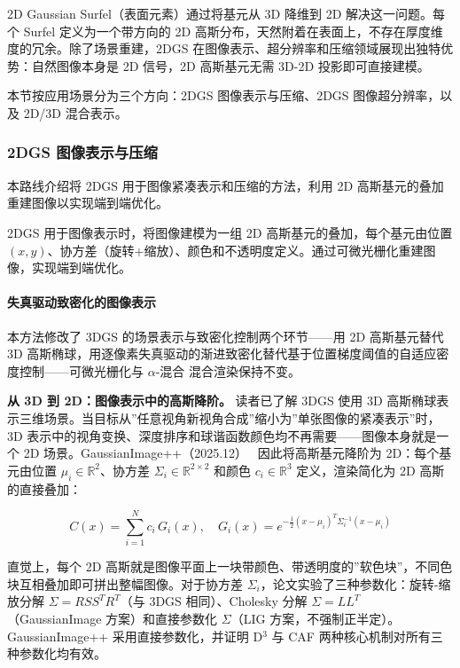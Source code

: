 2D Gaussian Surfel（表面元素）通过将基元从 3D 降维到 2D 解决这一问题。每个 Surfel 定义为一个带方向的 2D 高斯分布，天然附着在表面上，不存在厚度维度的冗余。除了场景重建，2DGS 在图像表示、超分辨率和压缩领域展现出独特优势：自然图像本身是 2D 信号，2D 高斯基元无需 3D-2D 投影即可直接建模。

本节按应用场景分为三个方向：2DGS 图像表示与压缩、2DGS 图像超分辨率，以及 2D/3D 混合表示。

\subsubsection{2DGS 图像表示与压缩}

本路线介绍将 2DGS 用于图像紧凑表示和压缩的方法，利用 2D 高斯基元的叠加重建图像以实现端到端优化。

2DGS 用于图像表示时，将图像建模为一组 2D 高斯基元的叠加，每个基元由位置 $(x, y)$、协方差（旋转+缩放）、颜色和不透明度定义。通过可微光栅化重建图像，实现端到端优化。

\paragraph{失真驱动致密化的图像表示}

本方法修改了 3DGS 的场景表示与致密化控制两个环节——用 2D 高斯基元替代 3D 高斯椭球，用逐像素失真驱动的渐进致密化替代基于位置梯度阈值的自适应密度控制——可微光栅化与 $\alpha$-混合 混合渲染保持不变。

\textbf{从 3D 到 2D：图像表示中的高斯降阶。} 读者已了解 3DGS 使用 3D 高斯椭球表示三维场景。当目标从”任意视角新视角合成”缩小为”单张图像的紧凑表示”时，3D 表示中的视角变换、深度排序和球谐函数颜色均不再需要——图像本身就是一个 2D 场景。GaussianImage++（2025.12）~\cite{2512_19108} 因此将高斯基元降阶为 2D：每个基元由位置 $\mu_i \in \mathbb{R}^2$、协方差 $\Sigma_i \in \mathbb{R}^{2 \times 2}$ 和颜色 $c_i \in \mathbb{R}^3$ 定义，渲染简化为 2D 高斯的直接叠加：

\begin{equation}
C(x) = \sum_{i=1}^{N} c_i \, G_i(x), \quad G_i(x) = e^{-\frac{1}{2}(x - \mu_i)^T \Sigma_i^{-1}(x - \mu_i)}
\end{equation}

直觉上，每个 2D 高斯就是图像平面上一块带颜色、带透明度的”软色块”，不同色块互相叠加即可拼出整幅图像。对于协方差 $\Sigma_i$，论文实验了三种参数化：旋转-缩放分解 $\Sigma = RSS^TR^T$（与 3DGS 相同）、Cholesky 分解 $\Sigma = LL^T$（GaussianImage 方案）和直接参数化 $\Sigma$（LIG 方案，不强制正半定）。GaussianImage++ 采用直接参数化，并证明 D$^3$ 与 CAF 两种核心机制对所有三种参数化均有效。

